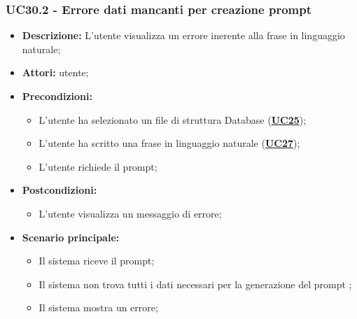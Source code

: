 \subsubsection{UC30.2 - Errore dati mancanti per creazione prompt}
\label{sec:UC30.2}
\begin{itemize}
	\item \textbf{Descrizione:} L’utente visualizza un errore inerente alla frase in linguaggio naturale;
	\item \textbf{Attori:} utente;
	\item \textbf{Precondizioni:} 
	\begin{itemize}
		\item L’utente ha selezionato un file di struttura Database (\hyperref[sec:UC25]{\textbf{UC25}});
		\item L’utente ha scritto una frase in linguaggio naturale (\hyperref[sec:UC27]{\textbf{UC27}});
		\item L’utente richiede il prompt;
	\end{itemize}
	\item \textbf{Postcondizioni:} 
	\begin{itemize}
		\item L’utente visualizza un messaggio di errore;
	\end{itemize}
	\item \textbf{Scenario principale:} 
	\begin{itemize}
		\item Il sistema riceve il prompt;
		\item Il sistema non trova tutti i dati necessari per la generazione del prompt ;
		\item Il sistema mostra un errore;
	\end{itemize}
\end{itemize}

